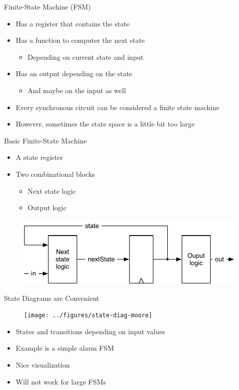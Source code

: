 \begin{frame}[fragile]{Finite-State Machine (FSM)}
\begin{itemize}
\item Has a register that contains the state
\item Has a function to computer the next state
\begin{itemize}
\item Depending on current state and input
\end{itemize}
\item Has an output depending on the state
\begin{itemize}
\item And maybe on the input as well
\end{itemize}
\item Every synchronous circuit can be considered a finite state machine
\item However, sometimes the state space is a little bit too large
\end{itemize}
\end{frame}

\begin{frame}[fragile]{Basic Finite-State Machine}
\begin{itemize}
\item A state register
\item Two combinational blocks
\begin{itemize}
\item Next state logic
\item Output logic
\end{itemize}
\end{itemize}
\begin{figure}
  \includegraphics[scale=\scale]{../figures/fsm}
\end{figure}
\end{frame}

\begin{frame}[fragile]{State Diagrams are Convenient}
\begin{figure}
  \texttt{[image: ../figures/state-diag-moore]}
\end{figure}
\begin{itemize}
\item States and transitions depending on input values
\item Example is a simple alarm FSM
\item Nice visualization
\item Will not work for large FSMs
\end{itemize}
\end{frame}


